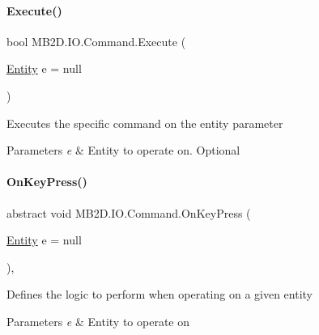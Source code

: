 \paragraph{\texorpdfstring{Execute()}{Execute()}}
{\footnotesize\ttfamily bool M\+B2\+D.\+I\+O.\+Command.\+Execute (\begin{DoxyParamCaption}\item[{\hyperlink{class_m_b2_d_1_1_entity_component_1_1_entity}{Entity}}]{e = {\ttfamily null} }\end{DoxyParamCaption})\hspace{0.3cm}{\ttfamily [inline]}}



Executes the specific command on the entity parameter 


\begin{DoxyParams}{Parameters}
{\em e} & Entity to operate on. Optional\\
\hline
\end{DoxyParams}
\hypertarget{class_m_b2_d_1_1_i_o_1_1_command_ae927e36c0e285848325cc68eddb5fd72}{}\label{class_m_b2_d_1_1_i_o_1_1_command_ae927e36c0e285848325cc68eddb5fd72} 
\paragraph{\texorpdfstring{On\+Key\+Press()}{OnKeyPress()}}
{\footnotesize\ttfamily abstract void M\+B2\+D.\+I\+O.\+Command.\+On\+Key\+Press (\begin{DoxyParamCaption}\item[{\hyperlink{class_m_b2_d_1_1_entity_component_1_1_entity}{Entity}}]{e = {\ttfamily null} }\end{DoxyParamCaption})\hspace{0.3cm}{\ttfamily [protected]}, {}}



Defines the logic to perform when operating on a given entity 


\begin{DoxyParams}{Parameters}
{\em e} & Entity to operate on\\
\hline
\end{DoxyParams}


